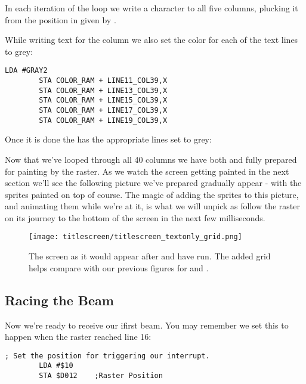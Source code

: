 In each iteration of the loop we write a character to all five columns, plucking it from the position in
 given by . 



While writing text for the column we also set the color for each of the text lines to grey:

\begin{lstlisting}[caption=In \icode{DrawTitleScreenText}]
        LDA #GRAY2
        STA COLOR_RAM + LINE11_COL39,X
        STA COLOR_RAM + LINE13_COL39,X
        STA COLOR_RAM + LINE15_COL39,X
        STA COLOR_RAM + LINE17_COL39,X
        STA COLOR_RAM + LINE19_COL39,X
\end{lstlisting}

Once it is done the  has the appropriate lines set to grey:


Now that we've looped through all 40 columns we have both  and  fully
prepared for painting by the raster. As we watch the screen getting painted in the next section we'll see
the following picture we've prepared gradually appear - with the sprites painted on top of course. The
magic of adding the sprites to this picture, and animating them while we're at it, is what we will
unpick as follow the raster on its journey to the bottom of the screen in the next few milliseconds.

\begin{figure}[H]
    \begin{adjustbox}{width=13cm,center}
    \texttt{[image: titlescreen/titlescreen\_textonly\_grid.png]}%
    \end{adjustbox}
  \caption{The screen as it would appear after  and  have run. The added
  grid helps compare with our previous figures for  and .}
\end{figure}

\subsection{Racing the Beam}
Now we're ready to receive our ifirst beam. You may remember we set this to happen when the raster reached line 16:

\begin{lstlisting}[caption=In \icode{InitializeSpritesAndInterruptsForTitleScreen}]
        ; Set the position for triggering our interrupt.
        LDA #$10
        STA $D012    ;Raster Position
\end{lstlisting}


